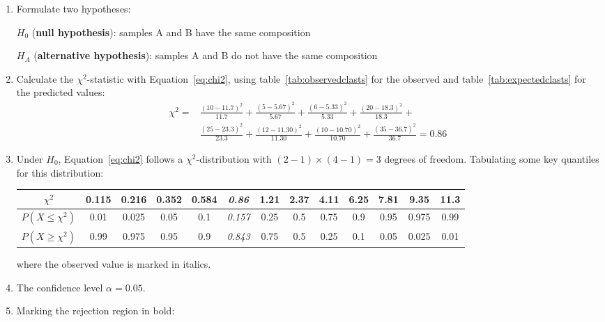 \begin{enumerate}
\item  Formulate two hypotheses:

  $H_0$ (\textbf{null hypothesis}): samples A and B have the same composition

  $H_{\!A}$ (\textbf{alternative hypothesis}):
  samples A and B do not have the same composition
  
\item Calculate the $\chi^2$-statistic with Equation~\ref{eq:chi2},
  using table~\ref{tab:observedclasts} for the observed and
  table~\ref{tab:expectedclasts} for the predicted values:
  \begin{equation}
    \begin{split}
      \chi^2 = &
      \frac{(10-11.7)^2}{11.7} + \frac{(5-5.67)^2}{5.67} +
      \frac{(6-5.33)^2}{5.33} + \frac{(20-18.3)^2}{18.3} + \\
      & \frac{(25-23.3)^2}{23.3} + \frac{(12-11.30)^2}{11.30} +
      \frac{(10-10.70)^2}{10.70} + \frac{(35-36.7)^2}{36.7} = 0.86
    \end{split}
  \end{equation}

\item Under $H_0$, Equation~\ref{eq:chi2} follows a
  $\chi^2$-distribution with $(2-1)\times(4-1)=3$ degrees of
  freedom. Tabulating some key quantiles for this distribution:

  \begin{center}
    \begin{tabular}{c|c@{\gap}c@{\gap}c@{\gap}c@{\gap}
        c@{\gap}c@{\gap}c@{\gap}c@{\gap}c@{\gap}c@{\gap}c@{\gap}c}
      $\chi^2$ & 0.115 & 0.216 & 0.352 & 0.584 & \textit{0.86} &
      1.21 & 2.37 & 4.11 & 6.25 & 7.81 & 9.35 & 11.3 \\ \hline
      $P(X\leq{\chi^2})$ & 0.01 & 0.025 & 0.05 & 0.1 & \textit{0.157} &
      0.25 & 0.5 & 0.75 & 0.9 & 0.95 & 0.975 & 0.99 \\
      $P(X\geq{\chi^2})$ & 0.99 & 0.975 & 0.95 & 0.9 & \textit{0.843} & 
      0.75 & 0.5 & 0.25 & 0.1 & 0.05 & 0.025 & 0.01
    \end{tabular}
  \end{center}

  \noindent where the observed value is marked in italics.
  
\item The confidence level $\alpha = 0.05$.

\item Marking the rejection region in bold:
  

\end{enumerate}
